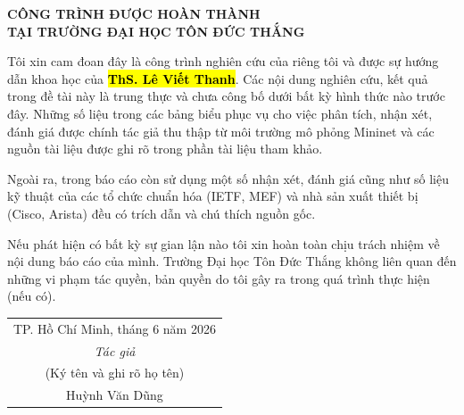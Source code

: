 \begin{center}
\pagestyle{empty}
\textbf{\Large CÔNG TRÌNH ĐƯỢC HOÀN THÀNH}\\
\vspace{0.5cm}
\Large \textbf{TẠI TRƯỜNG ĐẠI HỌC TÔN ĐỨC THẮNG}
\end{center}

\vspace{1cm}

Tôi xin cam đoan đây là công trình nghiên cứu của riêng tôi và được sự hướng dẫn khoa học của \hl{\textbf{ThS. Lê Viết Thanh}}. Các nội dung nghiên cứu, kết quả trong đề tài này là trung thực và chưa công bố dưới bất kỳ hình thức nào trước đây. Những số liệu trong các bảng biểu phục vụ cho việc phân tích, nhận xét, đánh giá được chính tác giả thu thập từ môi trường mô phỏng Mininet và các nguồn tài liệu được ghi rõ trong phần tài liệu tham khảo.

Ngoài ra, trong báo cáo còn sử dụng một số nhận xét, đánh giá cũng như số liệu kỹ thuật của các tổ chức chuẩn hóa (IETF, MEF) và nhà sản xuất thiết bị (Cisco, Arista) đều có trích dẫn và chú thích nguồn gốc.

Nếu phát hiện có bất kỳ sự gian lận nào tôi xin hoàn toàn chịu trách nhiệm về nội dung báo cáo của mình. Trường Đại học Tôn Đức Thắng không liên quan đến những vi phạm tác quyền, bản quyền do tôi gây ra trong quá trình thực hiện (nếu có).

 \begin{flushright}
\begin{tabular}{c}
    \multicolumn{1}{r}{TP. Hồ Chí Minh, tháng 6 năm 2026}\\
    \noalign{\vspace{0.5cm}}
    \textit{Tác giả} \\
    (Ký tên và ghi rõ họ tên) \\
    \noalign{\vspace{2cm}}
    Huỳnh Văn Dũng \\
\end{tabular}

\end{flushright}